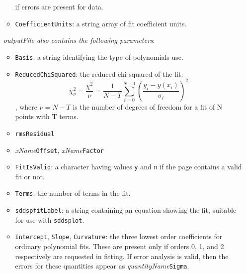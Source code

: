 \begin{itemize}
\begin{itemize}
        if errors are present for data.
\item {\tt CoefficientUnits}: a string array of fit coefficient units.
\end{itemize}
{\em outputFile also contains the following parameters}:
\begin{itemize}
\item {\tt Basis}: a string identifying the type of polynomials use.
\item {\tt ReducedChiSquared}: the reduced chi-squared of the fit:
$$ \chi^2_\nu = \frac{\chi^2}{\nu} = \frac{1}{N-T}\sum_{i=0}^{N-1} \left(\frac{y_i - y(x_i)}{\sigma_i}\right)^2 $$,
where $\nu = N-T$ is the number of degrees of freedom for a fit of N points with T terms.
\item {\tt rmsResidual}
\item {\em xName}{\tt Offset}, {\em xName}{\tt Factor}
\item {\tt FitIsValid}: a character having values {\tt y} and {\tt n} if the page contains a valid fit or not.
\item {\tt Terms}: the number of terms in the fit.
\item {\tt sddspfitLabel}: a string containing an equation showing the fit, suitable for use with {\tt sddsplot}.
\item {\tt Intercept}, {\tt Slope}, {\tt Curvature}: the three lowest order coefficients for ordinary polynomial fits.
These are present only if orders 0, 1, and 2 respectively are requested in fitting.  If error analysis is valid,
then the errors for these quantities appear as {\em quantityName}{\tt Sigma}.
\end{itemize}


\end{itemize}
